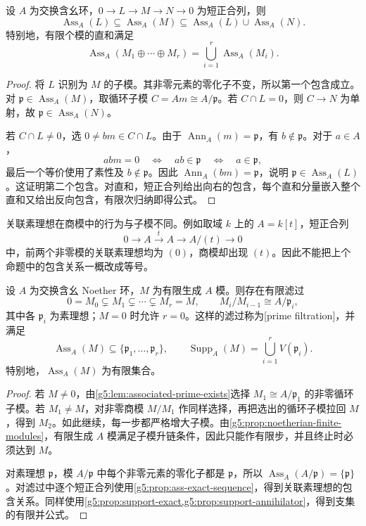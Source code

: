 \begin{proposition}\label{g5:prop:ass-exact-sequence}
	设 \(A\) 为交换含幺环，\(0\to L\to M\to N\to0\) 为短正合列，则
	\[
		\operatorname{Ass}_A(L)\subseteq\operatorname{Ass}_A(M)
		\subseteq\operatorname{Ass}_A(L)\cup\operatorname{Ass}_A(N).
	\]
	特别地，有限个模的直和满足
	\[
		\operatorname{Ass}_A(M_1\oplus\cdots\oplus M_r)
		=\bigcup_{i=1}^r\operatorname{Ass}_A(M_i).
	\]
\end{proposition}
\begin{proof}
	将 \(L\) 识别为 \(M\) 的子模。其非零元素的零化子不变，所以第一个包含成立。对 \(\mathfrak p\in\operatorname{Ass}_A(M)\)，取循环子模 \(C=Am\cong A/\mathfrak p\)。若 \(C\cap L=0\)，则 \(C\to N\) 为单射，故 \(\mathfrak p\in\operatorname{Ass}_A(N)\)。

	若 \(C\cap L\ne0\)，选 \(0\ne bm\in C\cap L\)。由于 \(\operatorname{Ann}_A(m)=\mathfrak p\)，有 \(b\notin\mathfrak p\)。对于 \(a\in A\)，
	\[
		abm=0\quad\Longleftrightarrow\quad ab\in\mathfrak p
		\quad\Longleftrightarrow\quad a\in\mathfrak p,
	\]
	最后一个等价使用了素性及 \(b\notin\mathfrak p\)。因此 \(\operatorname{Ann}_A(bm)=\mathfrak p\)，说明 \(\mathfrak p\in\operatorname{Ass}_A(L)\)。这证明第二个包含。对直和，短正合列给出向右的包含，每个直和分量嵌入整个直和又给出反向包含，有限次归纳即得公式。
\end{proof}

关联素理想在商模中的行为与子模不同。例如取域 \(k\) 上的 \(A=k[t]\)，短正合列
\[
	0\longrightarrow A\xrightarrow{\,t\,}A\longrightarrow A/(t)\longrightarrow0
\]
中，前两个非零模的关联素理想均为 \((0)\)，商模却出现 \((t)\)。因此不能把上个命题中的包含关系一概改成等号。

\begin{theorem}\label{g5:thm:prime-filtration}
	设 \(A\) 为交换含幺 Noether 环，\(M\) 为有限生成 \(A\) 模。则存在有限滤过
	\[
		0=M_0\subsetneq M_1\subsetneq\cdots\subsetneq M_r=M,
		\qquad M_i/M_{i-1}\cong A/\mathfrak p_i,
	\]
	其中各 \(\mathfrak p_i\) 为素理想；\(M=0\) 时允许 \(r=0\)。这样的滤过称为[prime filtration]，并满足
	\[
		\operatorname{Ass}_A(M)\subseteq\{\mathfrak p_1,\ldots,\mathfrak p_r\},
		\qquad \operatorname{Supp}_A(M)=\bigcup_{i=1}^r V(\mathfrak p_i).
	\]
	特别地，\(\operatorname{Ass}_A(M)\) 为有限集合。
\end{theorem}
\begin{proof}
	若 \(M\ne0\)，由\cref{g5:lem:associated-prime-exists}选择 \(M_1\cong A/\mathfrak p_1\) 的非零循环子模。若 \(M_1\ne M\)，对非零商模 \(M/M_1\) 作同样选择，再把选出的循环子模拉回 \(M\)，得到 \(M_2\)。如此继续，每一步都严格增大子模。由\cref{g5:prop:noetherian-finite-modules}，有限生成 \(A\) 模满足子模升链条件，因此只能作有限步，并且终止时必须达到 \(M\)。

	对素理想 \(\mathfrak p\)，模 \(A/\mathfrak p\) 中每个非零元素的零化子都是 \(\mathfrak p\)，所以 \(\operatorname{Ass}_A(A/\mathfrak p)=\{\mathfrak p\}\)。对滤过中逐个短正合列使用\cref{g5:prop:ass-exact-sequence}，得到关联素理想的包含关系。同样使用\cref{g5:prop:support-exact,g5:prop:support-annihilator}，得到支集的有限并公式。
\end{proof}

